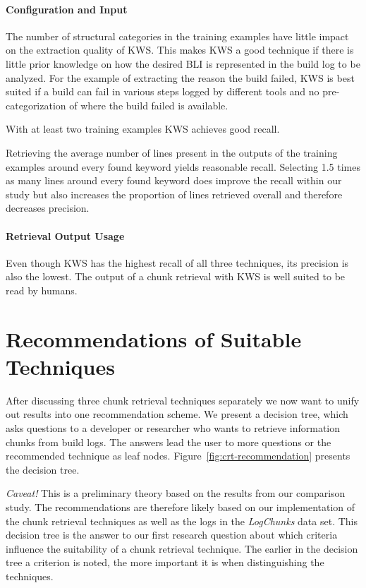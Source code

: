 \documentclass[\myrootdir/main.tex]{subfiles}
\begin{document}
\paragraph{Configuration and Input}
The number of structural categories in the training examples have little impact on the extraction quality of KWS\@.
This makes KWS a good technique if there is little prior knowledge on how the desired BLI is represented in the build log to be analyzed.
For the example of extracting the reason the build failed, KWS is best suited if a build can fail in various steps logged by different tools and no pre-categorization of where the build failed is available.

With at least two training examples KWS achieves good recall.

Retrieving the average number of lines present in the outputs of the training examples around every found keyword yields reasonable recall.
Selecting 1.5 times as many lines around every found keyword does improve the recall within our study but also increases the proportion of lines retrieved overall and therefore decreases precision.

\paragraph{Retrieval Output Usage}
Even though KWS has the highest recall of all three techniques, its precision is also the lowest.
The output of a chunk retrieval with KWS is well suited to be read by humans.

\section{Recommendations of Suitable Techniques}
After discussing three chunk retrieval techniques separately we now want to unify out results into one recommendation scheme.
We present a decision tree, which asks questions to a developer or researcher who wants to retrieve information chunks from build logs.
The answers lead the user to more questions or the recommended technique as leaf nodes.
Figure~\ref{fig:crt-recommendation} presents the decision tree.

\emph{Caveat!} This is a preliminary theory based on the results from our comparison study.
The recommendations are therefore likely based on our implementation of the chunk retrieval techniques as well as the logs in the \emph{LogChunks} data set.
This decision tree is the answer to our first research question about which criteria influence the suitability of a chunk retrieval technique.
The earlier in the decision tree a criterion is noted, the more important it is when distinguishing the techniques.
\end{document}

